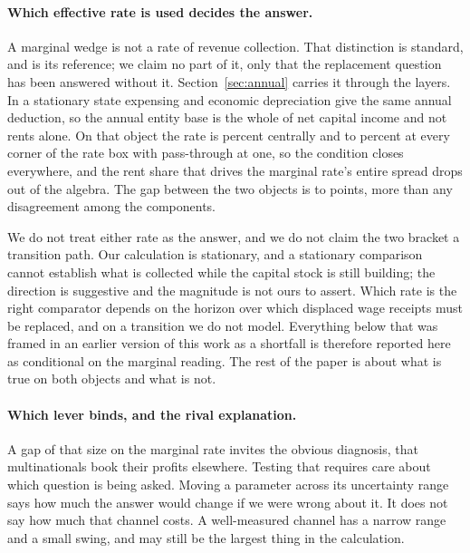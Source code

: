 \paragraph{Which effective rate is used decides the answer.} A marginal wedge is not a rate of
revenue collection. That distinction is standard, and \citet{DevereuxGriffith2003} is its
reference; we claim no part of it, only that the replacement question has been answered without
it. Section~\ref{sec:annual} carries it through the layers. In a stationary state expensing and economic depreciation give the same annual deduction, so
the annual entity base is the whole of net capital income and not rents alone. On that object the
rate is  percent centrally and  to
 percent at every corner of the rate box with pass-through at one, so the condition closes
everywhere, and the rent share that drives the marginal rate's entire spread drops out of the
algebra. The gap between the two objects is  to
 points, more than any disagreement among the components.

We do not treat either rate as the answer, and we do not claim the two bracket a transition
path. Our calculation is stationary, and a stationary comparison cannot establish what is
collected while the capital stock is still building; the direction is suggestive and the
magnitude is not ours to assert. Which rate is the right comparator depends on the horizon over
which displaced wage receipts must be replaced, and on a transition we do not model. Everything
below that was framed in an earlier version of this work as a shortfall is therefore reported
here as conditional on the marginal reading. The rest of the paper is about what is true on both
objects and what is not.

\paragraph{Which lever binds, and the rival explanation.} A gap of that size on the marginal
rate invites the obvious diagnosis, that multinationals book their profits elsewhere. Testing that requires
care about which question is being asked. Moving a parameter across its uncertainty range says
how much the answer would change if we were wrong about it. It does not say how much that
channel costs. A well-measured channel has a narrow range and a small swing, and may still be
the largest thing in the calculation.

